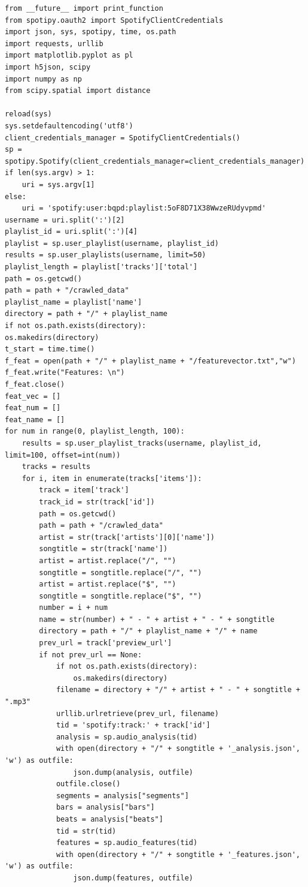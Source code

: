 \documentclass[a4paper,oneside,12pt]{report}
\begin{document}
\begin{lstlisting}
from __future__ import print_function 
from spotipy.oauth2 import SpotifyClientCredentials
import json, sys, spotipy, time, os.path
import requests, urllib
import matplotlib.pyplot as pl
import h5json, scipy
import numpy as np
from scipy.spatial import distance

reload(sys)
sys.setdefaultencoding('utf8')
client_credentials_manager = SpotifyClientCredentials()
sp = spotipy.Spotify(client_credentials_manager=client_credentials_manager)
if len(sys.argv) > 1:
	uri = sys.argv[1]
else:
	uri = 'spotify:user:bqpd:playlist:5oF8D71X38WwzeRUdyvpmd'
username = uri.split(':')[2]
playlist_id = uri.split(':')[4]
playlist = sp.user_playlist(username, playlist_id)
results = sp.user_playlists(username, limit=50)
playlist_length = playlist['tracks']['total']
path = os.getcwd() 
path = path + "/crawled_data" 
playlist_name = playlist['name']
directory = path + "/" + playlist_name
if not os.path.exists(directory):
os.makedirs(directory)
t_start = time.time()
f_feat = open(path + "/" + playlist_name + "/featurevector.txt","w")
f_feat.write("Features: \n")
f_feat.close()
feat_vec = []
feat_num = []
feat_name = []
for num in range(0, playlist_length, 100):
	results = sp.user_playlist_tracks(username, playlist_id, limit=100, offset=int(num))
	tracks = results
	for i, item in enumerate(tracks['items']):
		track = item['track']
		track_id = str(track['id'])
		path = os.getcwd() 
		path = path + "/crawled_data"
		artist = str(track['artists'][0]['name'])
		songtitle = str(track['name'])
		artist = artist.replace("/", "")
		songtitle = songtitle.replace("/", "")
		artist = artist.replace("$", "")
		songtitle = songtitle.replace("$", "")
		number = i + num
		name = str(number) + " - " + artist + " - " + songtitle
		directory = path + "/" + playlist_name + "/" + name
		prev_url = track['preview_url']
		if not prev_url == None:
			if not os.path.exists(directory):
				os.makedirs(directory)
			filename = directory + "/" + artist + " - " + songtitle + ".mp3"         
			urllib.urlretrieve(prev_url, filename)			
			tid = 'spotify:track:' + track['id']
			analysis = sp.audio_analysis(tid)	
			with open(directory + "/" + songtitle + '_analysis.json', 'w') as outfile:
				json.dump(analysis, outfile)
			outfile.close()            
			segments = analysis["segments"]
			bars = analysis["bars"]
			beats = analysis["beats"]            
			tid = str(tid)
			features = sp.audio_features(tid)
			with open(directory + "/" + songtitle + '_features.json', 'w') as outfile:
				json.dump(features, outfile)

\end{lstlisting}
\end{document}
